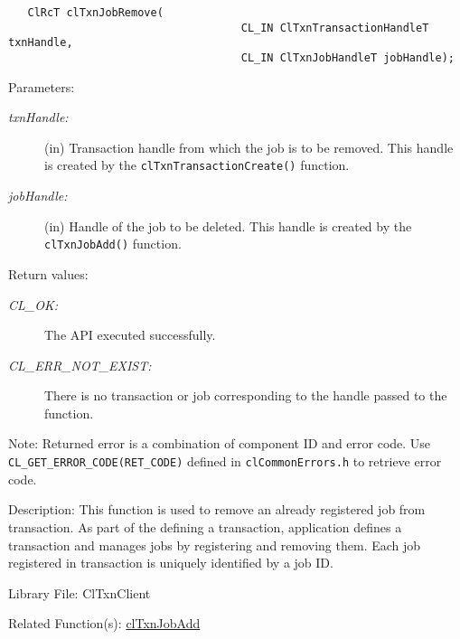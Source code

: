 \begin{flushleft}
\begin{Desc}
\footnotesize\begin{verbatim}   ClRcT clTxnJobRemove(
                              		CL_IN ClTxnTransactionHandleT txnHandle,
                              		CL_IN ClTxnJobHandleT jobHandle);
\end{verbatim}
\normalsize
\end{Desc}
\begin{Desc}
\item[Parameters:]
\begin{description}
\item[{\em txn\-Handle:}](in) Transaction handle from which the job is to be removed. This handle is created by the {\tt{clTxnTransactionCreate()}}
function.
\item[{\em job\-Handle:}](in) Handle of the job to be deleted. This handle is created by the {\tt{clTxnJobAdd()}} function.\end{description}
\end{Desc}
\begin{Desc}
\item[Return values:]
\begin{description}
\item[{\em CL\_\-OK:}]The API executed successfully. \item[{\em CL\_\-ERR\_\-NOT\_\-EXIST:}]There is no transaction or job corresponding to the handle
passed to the function.
\end{description}
\end{Desc}
\begin{Desc}
\item[Note:]Returned error is a combination of component ID and error code. Use {\tt{CL\_\-GET\_\-ERROR\_\-CODE(RET\_\-CODE)}} defined in
{\tt{clCommonErrors.h}} to retrieve error code.\end{Desc}
\begin{Desc}
\item[Description:]This function is used to remove an already registered job from transaction. As part of the defining a transaction, application 
defines a transaction and manages jobs by registering and removing them. Each job registered in transaction is uniquely identified by a job ID.\end{Desc}
\begin{Desc}
\item[Library File:]Cl\-Txn\-Client\end{Desc}
\begin{Desc}
\item[Related Function(s):]\hyperlink{pagetxn107}{cl\-Txn\-Job\-Add} \end{Desc}
\newpage



\end{flushleft}

